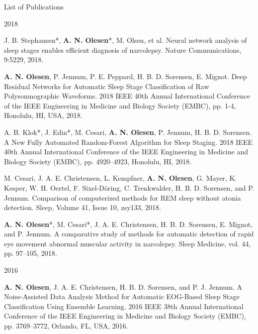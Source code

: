 \documentclass{resume} %
\begin{document}
\begin{rSection}{List of Publications}
	\begin{rSubsection}{2018}{}{}{}
	    \item J. B. Stephansen\mbox{*}, \textbf{A. N. Olesen}\mbox{*}, M. Olsen, et al. Neural network analysis of sleep stages enables efficient diagnosis of narcolepsy. Nature Communications, 9:5229, 2018.\medskip
	    \item \textbf{A. N. Olesen}, P. Jennum, P. E. Peppard, H. B. D. Sorensen, E. Mignot. Deep Residual Networks for Automatic Sleep Stage Classification of Raw Polysomnographic Waveforms. 2018 IEEE 40th Annual International Conference of the IEEE Engineering in Medicine and Biology Society (EMBC), pp. 1-4, Honolulu, HI, USA, 2018. \medskip
	    \item A. B. Klok\mbox{*}, J. Edin\mbox{*}, M. Cesari, \textbf{A. N. Olesen}, P. Jennum, H. B. D. Sorensen. A New Fully Automated Random-Forest Algorithm for Sleep Staging. 2018 IEEE 40th Annual International Conference of the IEEE Engineering in Medicine and Biology Society (EMBC), pp. 4920–4923, Honolulu, HI, 2018. \medskip
	    \item M. Cesari, J. A. E. Christensen, L. Kempfner, \textbf{A. N. Olesen}, G. Mayer, K. Kesper, W. H. Oertel, F. Sixel-Döring, C. Trenkwalder, H. B. D. Sorensen, and P. Jennum. Comparison of computerized methods for REM sleep without atonia detection. Sleep, Volume 41, Issue 10, zsy133, 2018. \medskip
	    \item \textbf{A. N. Olesen}\mbox{*}, M. Cesari\mbox{*}, J. A. E. Christensen, H. B. D. Sorensen, E. Mignot, and P. Jennum. A comparative study of methods for automatic detection of rapid eye movement abnormal muscular activity in narcolepsy. Sleep Medicine, vol. 44, pp. 97–105, 2018.
	\end{rSubsection}
	
	\begin{rSubsection}{2016}{}{}{}
	    \item \textbf{A. N. Olesen}, J. A. E. Christensen, H. B. D. Sorensen, and P. J. Jennum. A Noise-Assisted Data Analysis Method for Automatic EOG-Based Sleep Stage Classification Using Ensemble Learning. 2016 IEEE 38th Annual International Conference of the IEEE Engineering in Medicine and Biology Society (EMBC), pp. 3769–3772, Orlando, FL, USA, 2016.
	\end{rSubsection}
	
	
\end{rSection}
\end{document}

